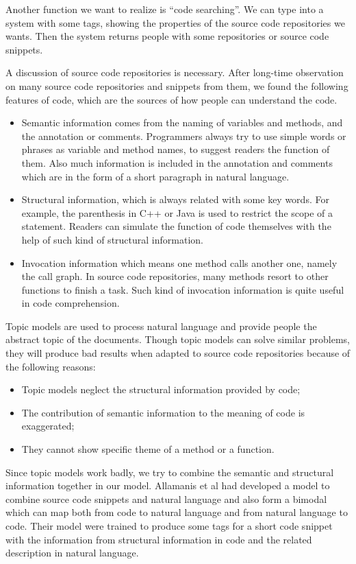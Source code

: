 Another function we want to realize is ``code searching''. We can type into a system with some tags, showing the
properties of the source code repositories we wants. Then the system returns people with some repositories or
source code snippets.

A discussion of source code repositories is necessary.
After long-time observation on many source code repositories and snippets from them,
we found the following features of code, which are the sources of how people can understand the code.
\begin{itemize}
\item Semantic information comes from the naming of variables and methods, and the annotation or comments.
Programmers always try to use simple words or phrases as variable and method names, to suggest readers the
function of them. Also much information is included in the annotation and comments which are in the form
of a short paragraph in natural language.
\item Structural information, which is always related with some key words. For example, the parenthesis in C++ or Java
is used to restrict the scope of a statement. Readers can simulate the function of code themselves with the help of
such kind of structural information.
\item Invocation information which means one method calls another one, namely the call graph. In source
code repositories, many methods resort to other functions to finish a task. Such kind of invocation information
is quite useful in code comprehension.
\end{itemize}

Topic models are used to process natural language and provide people the abstract topic of the documents.
Though topic models can solve similar problems, they will produce bad results when adapted to
source code repositories because of the following reasons:
\begin{itemize}
\item Topic models neglect the structural information provided by code;
\item The contribution of semantic information to the meaning of code is exaggerated;
\item They cannot show specific theme of a method or a function.
\end{itemize}

Since topic models work badly, we try to combine the semantic and structural information together
in our model. Allamanis et al\cite{allamanis2015bimodal} had developed a model to combine
source code snippets and natural language and also form a bimodal which can map both from code to natural
language and from natural language to code. Their model were trained to produce some tags for a short
code snippet with the information from structural information in code and the related description in natural
language.

